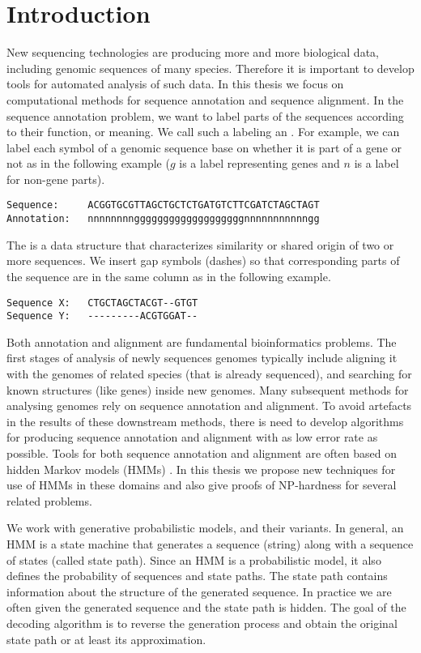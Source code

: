 \chapter{Introduction}

New sequencing technologies are producing more and more biological data,
including genomic sequences of many species. Therefore it is important to
develop tools for automated analysis of such data. In this thesis we focus on
computational methods for sequence annotation and sequence alignment.  In the
sequence annotation problem, we want to label parts of the sequences according
to their function, or meaning. We call
such a labeling an . For example,  we 
can label each symbol of a genomic sequence base on whether it is part of a
gene or not as in the following example ($g$ is a label representing genes and $n$ is a label for non-gene parts).
\begin{verbatim}
Sequence:     ACGGTGCGTTAGCTGCTCTGATGTCTTCGATCTAGCTAGT 
Annotation:   nnnnnnnngggggggggggggggggggnnnnnnnnnnngg
\end{verbatim}
The  is a data structure
that characterizes similarity or shared origin of two or more sequences.
We insert gap symbols (dashes) so that corresponding parts of the sequence are in the same column as in the following
example.
\begin{verbatim}
Sequence X:   CTGCTAGCTACGT--GTGT
Sequence Y:   ---------ACGTGGAT--
\end{verbatim}
Both annotation and alignment are fundamental bioinformatics problems. 
The first stages of analysis of newly 
sequences genomes typically include aligning it with the genomes of related 
species (that is already sequenced), and searching for known structures (like genes) inside
new genomes.
Many subsequent methods for analysing genomes rely on sequence
annotation and alignment. To avoid artefacts in the results of
these downstream methods, there is need to develop algorithms for producing sequence
annotation and alignment with as low error rate as possible.
Tools for both
sequence annotation and alignment are often based on hidden Markov models (HMMs)
\cite{Durbin1998,Alexanderson2004,Brejova2005, FEAST2011,Krogh2001,Majoros2005,
Meyer2002,Nanasi2010,Pairagon2009, Schultz2006,Kovac2012,Pachter2002,
Liu2010,Brown2010, Lunter2008}.  In this thesis we propose new techniques for
use of HMMs  in these domains and also give proofs of NP-hardness for several related problems.

We work with generative probabilistic models,  and their variants. In general, an HMM is a state machine that
generates a sequence (string) along with a sequence of states (called state path).
Since an HMM is a probabilistic model,
it also defines the probability of sequences and state paths. The state
path contains information about the structure of the generated sequence. In
practice we are often given the generated sequence and the state path is hidden. The
goal of the decoding algorithm is to reverse the generation process and obtain
the original state path or at least its approximation.

